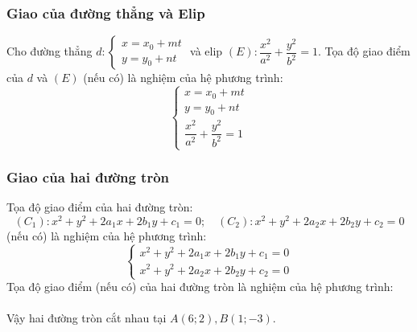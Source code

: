 \subsubsection*{Giao của đường thẳng và Elip} 
Cho đường thẳng $d: \begin{cases} x= x_0+mt \\y=y_0+nt\end{cases}$ và elip $\left(E\right): \dfrac{x^2}{a^2}+\dfrac{y^2}{b^2}=1$. Tọa độ giao điểm của $d$ và $\left(E\right)$ (nếu có) là nghiệm của hệ phương trình:
\begin{equation}
\begin{cases} x= x_0+mt \\y=y_0+nt \\ \dfrac{x^2}{a^2}+\dfrac{y^2}{b^2}=1 \end{cases}
\end{equation}
\subsubsection*{Giao của hai đường tròn} 
Tọa độ giao điểm của hai đường tròn:
$$\left(C_1\right):x^2+y^2+2a_1x+2b_1y+c_1=0; \quad \left(C_2\right):x^2+y^2+2a_2x+2b_2y+c_2=0 $$
(nếu có) là nghiệm của hệ phương trình:
\begin{equation}
\begin{cases}
x^2+y^2+2a_1x+2b_1y+c_1=0 \\ x^2+y^2+2a_2x+2b_2y+c_2=0
\end{cases}
\end{equation}
\lgi
Tọa độ giao điểm (nếu có) của hai đường tròn là nghiệm của hệ phương trình:\\
\cl{$\begin{cases}x^2+y^2-2x-4y-20=0 \\ x^2+y^2-7x+y=0 \end{cases} \Leftrightarrow  \begin{cases}x-y=4 \\ x^2+y^2-7x+y=0 \end{cases}  \Leftrightarrow  \begin{cases}x-y=4 \\ \left[ \begin{array}{l}x=6 \\x=1 \end{array} \right. \end{cases}$}\\
Vậy hai đường tròn cắt nhau tại $A(6;2), B(1;-3).$
